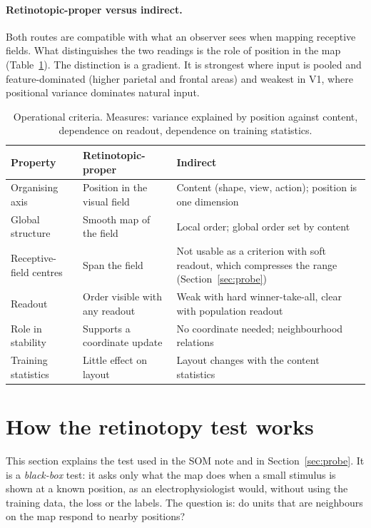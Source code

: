 \documentclass[11pt,a4paper]{article}
\newcommand{\ra}{\raggedright\arraybackslash}
\begin{document}
\paragraph{Retinotopic-proper versus indirect.} Both routes are compatible with
what an observer sees when mapping receptive fields. What distinguishes the two
readings is the role of position in the map (Table~\ref{tab:criteria}). The
distinction is a gradient. It is strongest where input is pooled and
feature-dominated (higher parietal and frontal areas) and weakest in V1, where
positional variance dominates natural input.

\begin{table}[h]
\centering\footnotesize
\setlength{\tabcolsep}{3pt}
\begin{tabular}{@{}>{\ra}p{3.1cm}>{\ra}p{5.8cm}>{\ra}p{5.8cm}@{}}
\toprule
Property & Retinotopic-proper & Indirect \\
\midrule
Organising axis & Position in the visual field & Content (shape, view, action); position is one dimension \\
Global structure & Smooth map of the field & Local order; global order set by content \\
Receptive-field centres & Span the field & Not usable as a criterion with soft readout, which compresses the range (Section~\ref{sec:probe}) \\
Readout & Order visible with any readout & Weak with hard winner-take-all, clear with population readout \\
Role in stability & Supports a coordinate update & No coordinate needed; neighbourhood relations \\
Training statistics & Little effect on layout & Layout changes with the content statistics \\
\bottomrule
\end{tabular}
\caption{Operational criteria. Measures: variance explained by position against
content, dependence on readout, dependence on training statistics.}
\label{tab:criteria}
\end{table}

\section{How the retinotopy test works}
\label{sec:test}

This section explains the test used in the SOM note and in Section~\ref{sec:probe}.
It is a \emph{black-box} test: it asks only what the map does when a small stimulus
is shown at a known position, as an electrophysiologist would, without using the
training data, the loss or the labels. The question is: do units that are neighbours
on the map respond to nearby positions?
\end{document}
